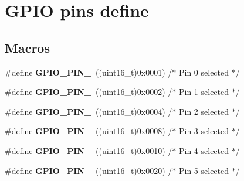\hypertarget{group___g_p_i_o__pins__define}{}\section{G\+P\+IO pins define}
\label{group___g_p_i_o__pins__define}
\subsection*{Macros}
\begin{DoxyCompactItemize}
\item 
\#define {\bfseries G\+P\+I\+O\+\_\+\+P\+I\+N\+\_}~((uint16\+\_\+t)0x0001)  /$\ast$ Pin 0 selected    $\ast$/\hypertarget{group___g_p_i_o__pins__define_ga176efbf43a259b7bb0a85a47401505be}{}\label{group___g_p_i_o__pins__define_ga176efbf43a259b7bb0a85a47401505be}

\item 
\#define {\bfseries G\+P\+I\+O\+\_\+\+P\+I\+N\+\_}~((uint16\+\_\+t)0x0002)  /$\ast$ Pin 1 selected    $\ast$/\hypertarget{group___g_p_i_o__pins__define_ga6c35af4e75c3cb57bb650feaa7a136b5}{}\label{group___g_p_i_o__pins__define_ga6c35af4e75c3cb57bb650feaa7a136b5}

\item 
\#define {\bfseries G\+P\+I\+O\+\_\+\+P\+I\+N\+\_}~((uint16\+\_\+t)0x0004)  /$\ast$ Pin 2 selected    $\ast$/\hypertarget{group___g_p_i_o__pins__define_ga6eee38b797a7268f04357dfa2759efd2}{}\label{group___g_p_i_o__pins__define_ga6eee38b797a7268f04357dfa2759efd2}

\item 
\#define {\bfseries G\+P\+I\+O\+\_\+\+P\+I\+N\+\_}~((uint16\+\_\+t)0x0008)  /$\ast$ Pin 3 selected    $\ast$/\hypertarget{group___g_p_i_o__pins__define_gadcaf899c018a0dde572b5af783565c62}{}\label{group___g_p_i_o__pins__define_gadcaf899c018a0dde572b5af783565c62}

\item 
\#define {\bfseries G\+P\+I\+O\+\_\+\+P\+I\+N\+\_}~((uint16\+\_\+t)0x0010)  /$\ast$ Pin 4 selected    $\ast$/\hypertarget{group___g_p_i_o__pins__define_gab3871e35868deecd260e586ad70d4b83}{}\label{group___g_p_i_o__pins__define_gab3871e35868deecd260e586ad70d4b83}

\item 
\#define {\bfseries G\+P\+I\+O\+\_\+\+P\+I\+N\+\_}~((uint16\+\_\+t)0x0020)  /$\ast$ Pin 5 selected    $\ast$/\hypertarget{group___g_p_i_o__pins__define_ga01cc9ed93f6fd12fd3403362779aaa18}{}\label{group___g_p_i_o__pins__define_ga01cc9ed93f6fd12fd3403362779aaa18}


\end{DoxyCompactItemize}
